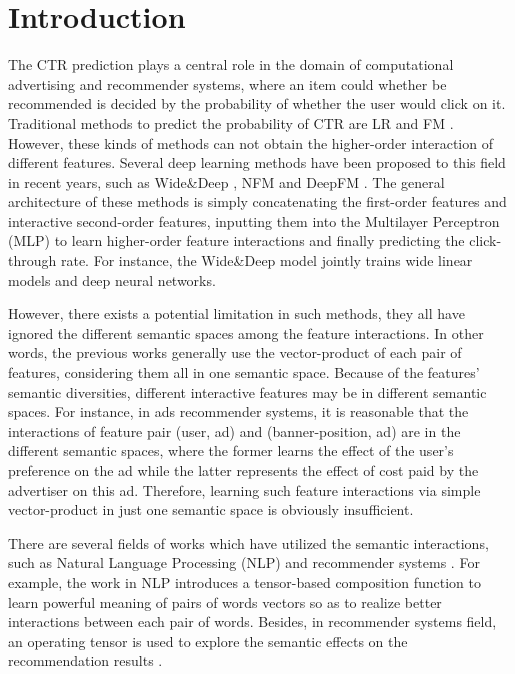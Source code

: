 \documentclass[sigconf]{acmart}
\begin{document}
\maketitle

\section{Introduction}
The CTR prediction plays a central role in the domain of computational advertising and recommender systems, where an item could whether be recommended is decided by the probability of whether the user would click on it. Traditional methods to predict the probability of CTR are LR and FM \cite{rendle2012factorization}. However, these kinds of methods can not obtain the higher-order interaction of different features. 
Several deep learning methods have been proposed to this field in recent years, such as Wide\&Deep \cite{cheng2016wide}, NFM \cite{he2017neural} and DeepFM \cite{guo2017deepfm}. The general architecture of these methods is simply concatenating the first-order features and interactive second-order features, inputting them into the Multilayer Perceptron (MLP) to learn higher-order feature interactions and finally predicting the click-through rate. For instance, the Wide\&Deep \cite{cheng2016wide} model jointly trains wide linear models and deep neural networks. 

However, there exists a potential limitation in such methods, they all have ignored the different semantic spaces among the feature interactions. In other words, the previous works generally use the vector-product of each pair of features, considering them all in one semantic space. Because of the features' semantic diversities, different interactive features may be in different semantic spaces. For instance, in ads recommender systems, it is reasonable that the interactions of feature pair (user, ad) and (banner-position, ad) are in the different semantic spaces, where the former learns the effect of the user's preference on the ad while the latter represents the effect of cost paid by the advertiser on this ad. Therefore, learning such feature interactions via simple vector-product in just one semantic space is obviously insufficient. 


There are several fields of works which have utilized the semantic interactions, such as Natural Language Processing (NLP) \cite{socher2013recursive} and recommender systems \cite{liu2015cot,Shu2016Contextual,liu2015convolutional}. For example, the work in NLP \cite{socher2013recursive} introduces a tensor-based composition function to learn powerful meaning of pairs of words vectors so as to realize better interactions between each pair of words. Besides, in recommender systems field, an operating tensor is used to explore the semantic effects on the recommendation results \cite{liu2015cot}. 
\end{document}
